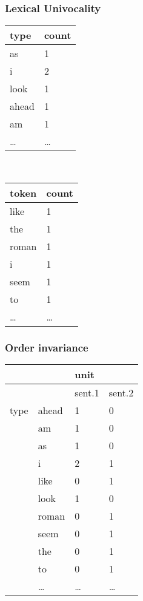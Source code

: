 \documentclass[11pt,compress,professionalfonts]{beamer}
\begin{document}
\begin{frame}[t,fragile]\frametitle{Lexical Univocality}

\begin{center}
\small
\begin{tabular}{ll}\toprule
type & count\\ \midrule
as & 1\\
i & 2\\
look & 1\\
ahead & 1\\
am & 1\\
\ldots & \ldots\\ \bottomrule
\end{tabular}
~~~~~~~~~~
\begin{tabular}{ll}\toprule
token & count\\ \midrule
like & 1\\
the & 1\\
roman & 1\\
i & 1\\
seem & 1\\
to & 1\\
\ldots & \ldots\\ \bottomrule
\end{tabular}
\normalsize
\end{center}

\end{frame}
\begin{frame}[t,fragile]\frametitle{Order invariance}

\begin{center}
\small
\begin{tabular}{rlll}\toprule
&         & unit    & \\ \midrule
&         & sent.1 & sent.2 \\ \midrule
type      & ahead   & 1    & 0 \\
& am      & 1    & 0 \\
& as      & 1    & 0 \\
& i       & 2    & 1 \\
& like    & 0    & 1\\
& look    & 1    & 0 \\
& roman   & 0    & 1 \\
& seem    & 0    & 1 \\
& the     & 0    & 1 \\
& to      & 0    & 1\\
& \ldots  & \ldots & \ldots \\ \bottomrule
\end{tabular}
\normalsize
\end{center}

\end{frame}
\end{document}
